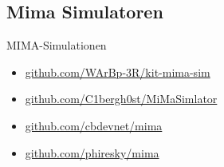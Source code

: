 \subsection{Mima Simulatoren} %
\begin{frame}{MIMA-Simulationen}
	    \begin{itemize}
	    	\item \url{github.com/WArBp-3R/kit-mima-sim}
	    	\item \url{github.com/C1bergh0st/MiMaSimlator}
	    	\item \url{github.com/cbdevnet/mima}
	    	\item \url{github.com/phiresky/mima}
	    \end{itemize}
	\end{frame}